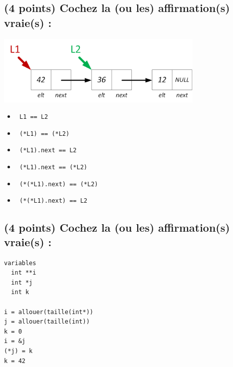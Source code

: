 \documentclass[11pt,a4paper]{article}
\begin{document}
\bigskip
\vspace*{1cm}


\subsection{(4 points) Cochez la (ou les) affirmation(s) vraie(s) : }

\begin{center}
\includegraphics[width=0.75\textwidth]{img/liste1.png}
\end{center}

\begin{itemize}
  \item[\CaseCoche] \lstinline[style=algorithmique]! L1 == L2 ! \\
  \item[\CaseCoche] \lstinline[style=algorithmique]! (*L1) == (*L2) ! \\
  \item[\CaseCoche] \lstinline[style=algorithmique]! (*L1).next == L2 ! \\
  \item[\CaseCoche] \lstinline[style=algorithmique]! (*L1).next == (*L2) ! \\
  \item[\CaseCoche] \lstinline[style=algorithmique]! (*(*L1).next) == (*L2) ! \\
  \item[\CaseCoche] \lstinline[style=algorithmique]! (*(*L1).next) == L2 ! \\
\end{itemize}


\vfillLast

\newpage

\subsection{(4 points) Cochez la (ou les) affirmation(s) vraie(s) : }

\begin{lstlisting}[style=algorithmique]
variables
  int **i
  int *j
  int k

i = allouer(taille(int*))
j = allouer(taille(int))
k = 0
i = &j
(*j) = k
k = 42
\end{lstlisting}
\end{document}
